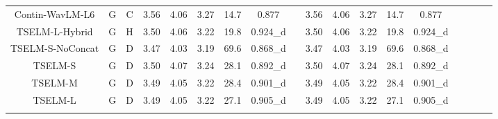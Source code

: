 \documentclass[conference]{IEEEtran}
\begin{document}
\begin{table}
\begin{center}
\begin{tabular}{cccccccccccccccccc}
  Contin-WavLM-L6     & G                                             & C                                                                                  & 3.56        & 4.06       & 3.27       & 14.7            & 0.877     &          & 3.56        & 4.06       & 3.27       & 14.7            & 0.877             \\
  TSELM-L-Hybrid          & G                                             & H                                                                                     & 3.50        & 4.06       & 3.22       & 19.8            & 0.924\_d  &          & 3.50        & 4.06       & 3.22       & 19.8            & 0.924\_d             \\
  TSELM-S-NoConcat        & G                                             & D                                                                                   & 3.47        & 4.03       & 3.19       & 69.6            & 0.868\_d    &        & 3.47        & 4.03       & 3.19       & 69.6            & 0.868\_d         \\ \hline
  TSELM-S                 & G                                             & D                                                                                    & 3.50        & 4.07       & 3.24       & 28.1            & 0.892\_d      &      & 3.50        & 4.07       & 3.24       & 28.1            & 0.892\_d            \\
  TSELM-M                 & G                                             & D                                                                                   & 3.49        & 4.05       & 3.22       & 28.4            & 0.901\_d    &        & 3.49        & 4.05       & 3.22       & 28.4            & 0.901\_d             \\
  TSELM-L                 & G                                             & D                                                                                  & 3.49        & 4.05       & 3.22       & 27.1            & 0.905\_d    &        & 3.49        & 4.05       & 3.22       & 27.1            & 0.905\_d        \\
  \Xhline{2\arrayrulewidth} %
  \end{tabular}
\end{center}
  \end{table}
\end{document}
